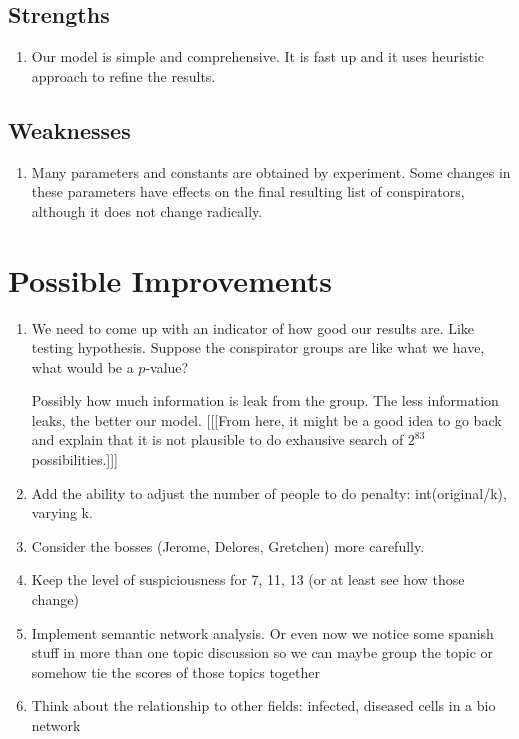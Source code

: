 \documentclass{icmmcm}
\begin{document}
\subsection{Strengths}
\begin{enumerate}
\item Our model is simple and comprehensive.
It is fast up and it uses heuristic approach
to refine the results.
\end{enumerate}
\subsection{Weaknesses}
\begin{enumerate}
\item Many parameters and constants are obtained
by experiment. Some changes in these parameters
have effects on the final resulting list
of conspirators, although it does not change
radically.
\end{enumerate}

\section{Possible Improvements}
\begin{enumerate}
\item We need to come up with an indicator of how good our results are.
Like testing hypothesis. Suppose the conspirator groups are 
like what we have, what would be a $p$-value?

Possibly how much information is leak from the group.
The less information leaks, the better our model.
 [[[From here, it might be a good idea to go back
and explain that it is not plausible to do exhausive search of
$2^{83}$ possibilities.]]]
\item Add the ability to adjust the number of people to do penalty: int(original/k), varying k.
\item Consider the bosses (Jerome, Delores, Gretchen) more carefully.
\item Keep the level of suspiciousness for 7, 11, 13 (or at least see how those change)
\item Implement semantic network analysis. 
	Or even now we notice some spanish stuff in more than one topic discussion
	so we can maybe group the topic or somehow tie the scores of those topics together
\item Think about the relationship to other fields: infected, diseased cells in a bio network
\end{enumerate}
\end{document}
